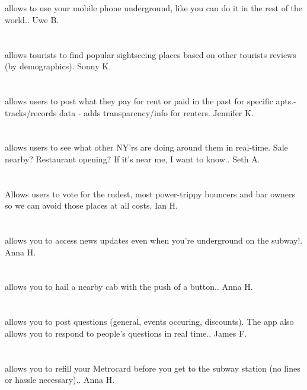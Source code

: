 \section{}allows to use your mobile phone underground,  like you can do it in the rest of the world.. Uwe B.
\section{}allows tourists to find popular sightseeing places based on other tourists reviews (by demographics). Sonny K.
\section{}allows users to post what they pay for rent or paid in the past for specific apts.-tracks/records data - adds transparency/info for renters. Jennifer K.
\section{}allows users to see what other NY'rs are doing around them in real-time. Sale nearby? Restaurant opening? If it's near me,  I want to know.. Seth A.
\section{}Allows users to vote for the rudest,  most power-trippy bouncers and bar owners so we can avoid those places at all costs. Ian H.
\section{}allows you to access news updates even when you're underground on the subway!. Anna H.
\section{}allows you to hail a nearby cab with the push of a button.. Anna H.
\section{}allows you to post questions (general,  events occuring,  discounts). The app also allows you to respond to people's questions in real time.. James F.
\section{}allows you to refill your Metrocard before you get to the subway station (no lines or hassle necessary).. Anna H.
